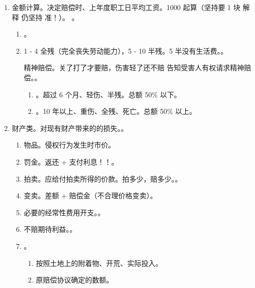 \begin{enumerate}
\begin{enumerate}
\begin{enumerate}
                  \item 救济。向上一级司法机关申诉！！。
                \end{enumerate}
          \item 金额计算。决定赔偿时、上年度职工日平均工资。1000 起算（坚持要 1 块 \yjt 解释 \yjt 仍坚持 \yjt 准！）。
                。
                \begin{enumerate}
                  \item {}。
                  \item 1 - 4 全残（完全丧失劳动能力），5 - 10 半残。5 半没有生活费。。
                        \begin{kk}{精神赔偿。关了打了才要赔，伤害轻了还不赔}
                          告知受害人有权请求精神赔偿。。
                          \begin{enumerate}
                            \item {}。超过 6 个月、轻伤、半残。总额 50\% 以下。
                            \item {}。10 年以上、重伤、全残、死亡。总额 50\% 以上。
                          \end{enumerate}
                        \end{kk}
                \end{enumerate}
          \item 财产类。对现有财产带来的的损失。。
                \begin{enumerate}
                  \item 物品。侵权行为发生时市价。
                  \item 罚金。返还 + 支付利息！！。
                  \item 拍卖。应给付拍卖所得的价款。拍多少，赔多少。。
                  \item 变卖。差额 + 赔偿金（不合理价格变卖）。
                  \item 必要的经常性费用开支。。
                  \item 不赔期待利益。。
                  \item {}。
                        \begin{enumerate}
                          \item 按照土地上的附着物、开荒、实际投入。
                          \item {}原赔偿协议确定的数额。
                        \end{enumerate}
                \end{enumerate}
        \end{enumerate}
\end{enumerate}
